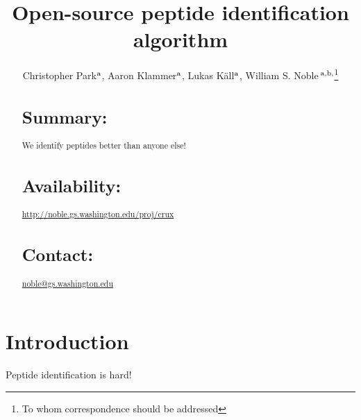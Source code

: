 \documentclass{bioinfo}
\begin{document}

\title[Open-source peptide identification algorithm]{Open-source
peptide identification algorithm}
\author[Park \textit{et~al}]{Christopher Park$^{\rm a}$, Aaron Klammer$^{\rm a}$,
Lukas K\"{a}ll$^{\rm a}$, 
William S. Noble\,$^{\rm a,b,}$\footnote{To whom correspondence should be addressed}}
\address{
$^{\rm a}$Department of Computer Science and Engineering,
$^{\rm b}$Department of Genome Sciences, University of Washington,
  Seattle, WA, USA
}
\maketitle

\begin{abstract}
\section{Summary:}

We identify peptides better than anyone else! 

\section{Availability:}
\href{http://noble.gs.washington.edu/proj/crux}{http://noble.gs.washington.edu/proj/crux}
\section{Contact:} \href{noble@gs.washington.edu}{noble@gs.washington.edu}
\end{abstract}

\section{Introduction}

Peptide identification is hard!
\end{document}
